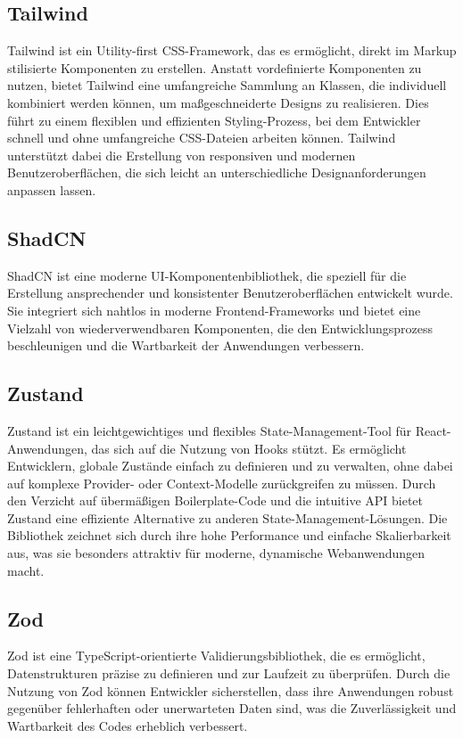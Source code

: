 \begin{inhalt}
\subsection{Tailwind}
Tailwind \cite{Tailwind} ist ein Utility-first CSS-Framework, das es ermöglicht, direkt im Markup stilisierte Komponenten zu erstellen. Anstatt vordefinierte Komponenten zu nutzen, bietet Tailwind eine umfangreiche Sammlung an Klassen, die individuell kombiniert werden können, um maßgeschneiderte Designs zu realisieren. Dies führt zu einem flexiblen und effizienten Styling-Prozess, bei dem Entwickler schnell und ohne umfangreiche CSS-Dateien arbeiten können. Tailwind unterstützt dabei die Erstellung von responsiven und modernen Benutzeroberflächen, die sich leicht an unterschiedliche Designanforderungen anpassen lassen.

\subsection{ShadCN}
ShadCN \cite{ShadCN} ist eine moderne UI-Komponentenbibliothek, die speziell für die Erstellung ansprechender und konsistenter Benutzeroberflächen entwickelt wurde. Sie integriert sich nahtlos in moderne Frontend-Frameworks und bietet eine Vielzahl von wiederverwendbaren Komponenten, die den Entwicklungsprozess beschleunigen und die Wartbarkeit der Anwendungen verbessern.


\subsection{Zustand} \label{subsec:Zustand} 
Zustand \cite{Zustand} ist ein leichtgewichtiges und flexibles State-Management-Tool für React-Anwendungen, das sich auf die Nutzung von Hooks stützt. Es ermöglicht Entwicklern, globale Zustände einfach zu definieren und zu verwalten, ohne dabei auf komplexe Provider- oder Context-Modelle zurückgreifen zu müssen. Durch den Verzicht auf übermäßigen Boilerplate-Code und die intuitive API bietet Zustand eine effiziente Alternative zu anderen State-Management-Lösungen. Die Bibliothek zeichnet sich durch ihre hohe Performance und einfache Skalierbarkeit aus, was sie besonders attraktiv für moderne, dynamische Webanwendungen macht.

\subsection{Zod}
\label{subsec:Zod}
Zod \cite{Zod} ist eine TypeScript-orientierte Validierungsbibliothek, die es ermöglicht, Datenstrukturen präzise zu definieren und zur Laufzeit zu überprüfen. Durch die Nutzung von Zod können Entwickler sicherstellen, dass ihre Anwendungen robust gegenüber fehlerhaften oder unerwarteten Daten sind, was die Zuverlässigkeit und Wartbarkeit des Codes erheblich verbessert.


\end{inhalt}
